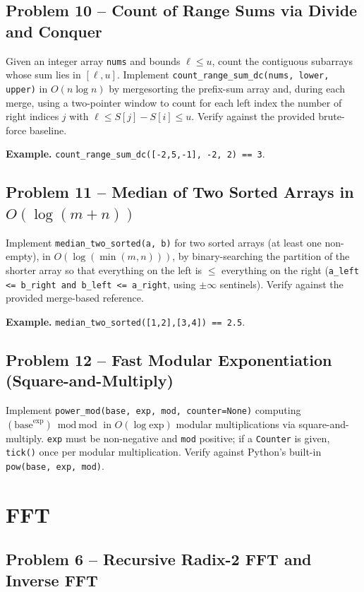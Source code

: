 \documentclass[11pt]{article}
\begin{document}
\subsection*{Problem 10 -- Count of Range Sums via Divide and Conquer}

Given an integer array \texttt{nums} and bounds $\ell \le u$, count the contiguous subarrays
whose sum lies in $[\ell, u]$. Implement \texttt{count\_range\_sum\_dc(nums, lower, upper)} in
$O(n \log n)$ by mergesorting the prefix-sum array and, during each merge, using a two-pointer
window to count for each left index the number of right indices $j$ with $\ell \le S[j]-S[i]
\le u$. Verify against the provided brute-force baseline.

\textbf{Example.} \texttt{count\_range\_sum\_dc([-2,5,-1], -2, 2) == 3}.

\subsection*{Problem 11 -- Median of Two Sorted Arrays in $O(\log(m+n))$}

Implement \texttt{median\_two\_sorted(a, b)} for two sorted arrays (at least one non-empty),
in $O(\log(\min(m,n)))$, by binary-searching the partition of the shorter array so that
everything on the left is $\le$ everything on the right (\texttt{a\_left <= b\_right and
b\_left <= a\_right}, using $\pm\infty$ sentinels). Verify against the provided merge-based
reference.

\textbf{Example.} \texttt{median\_two\_sorted([1,2],[3,4]) == 2.5}.

\subsection*{Problem 12 -- Fast Modular Exponentiation (Square-and-Multiply)}

Implement \texttt{power\_mod(base, exp, mod, counter=None)} computing $(\text{base}^{\text{exp}})
\bmod \text{mod}$ in $O(\log \text{exp})$ modular multiplications via square-and-multiply.
\texttt{exp} must be non-negative and \texttt{mod} positive; if a \texttt{Counter} is given,
\texttt{tick()} once per modular multiplication. Verify against Python's built-in
\texttt{pow(base, exp, mod)}.

\newpage
\section{FFT}

\subsection*{Problem 6 -- Recursive Radix-2 FFT and Inverse FFT}
\end{document}

